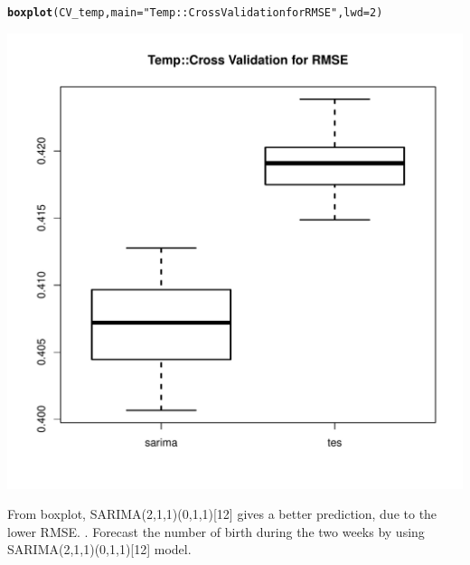 \documentclass[10pt]{article}\usepackage[]{graphicx}\usepackage[]{color}
\makeatletter
\def\maxwidth{ %
  \ifdim\Gin@nat@width>\linewidth
    \linewidth
  \else
    \Gin@nat@width
  \fi
}
\newcommand{\hlnum}[1]{\textcolor[rgb]{0.686,0.059,0.569}{#1}}%
\newcommand{\hlstr}[1]{\textcolor[rgb]{0.192,0.494,0.8}{#1}}%
\newcommand{\hlstd}[1]{\textcolor[rgb]{0.345,0.345,0.345}{#1}}%
\newcommand{\hlkwc}[1]{\textcolor[rgb]{0.333,0.667,0.333}{#1}}%
\newcommand{\hlkwd}[1]{\textcolor[rgb]{0.737,0.353,0.396}{\textbf{#1}}}%
\newenvironment{kframe}{%
 \def\at@end@of@kframe{}%
 \ifinner\ifhmode%
  \def\at@end@of@kframe{\end{minipage}}%
  \begin{minipage}{\columnwidth}%
 \fi\fi%
 \def\FrameCommand##1{\hskip\@totalleftmargin \hskip-\fboxsep
 \colorbox{shadecolor}{##1}\hskip-\fboxsep
     \hskip-\linewidth \hskip-\@totalleftmargin \hskip\columnwidth}%
 \MakeFramed {\advance\hsize-\width
   \@totalleftmargin\z@ \linewidth\hsize
   \@setminipage}}%
 {\par\unskip\endMakeFramed%
 \at@end@of@kframe}
\newenvironment{knitrout}{}{} %
\makeatother
\begin{document}
\begin{knitrout}
\begin{kframe}
\begin{alltt}
\hlkwd{boxplot}\hlstd{(CV_temp,}\hlkwc{main} \hlstd{=} \hlstr{"Temp::Cross Validation for RMSE"}\hlstd{,} \hlkwc{lwd}\hlstd{=}\hlnum{2}\hlstd{)}
\end{alltt}
\end{kframe}
\includegraphics[width=\maxwidth]{figure/unnamed-chunk-30-1} 

\end{knitrout}
From boxplot, SARIMA(2,1,1)(0,1,1)[12] gives a better prediction, due to the lower RMSE.
. Forecast the number of birth during the two weeks by using SARIMA(2,1,1)(0,1,1)[12] model.
\end{document}
